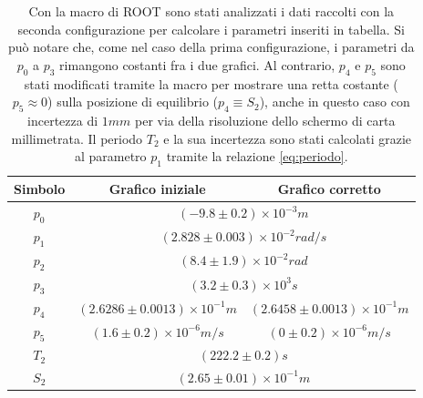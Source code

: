 \documentclass{article}
\begin{document}
\begin{table}[ht!]
     \centering
     \begin{tabular}{|c|c|c|}
         \hline
         Simbolo & Grafico iniziale & Grafico corretto \\
         \hline
         $p_0$ & \multicolumn{2}{c|}{$(-9.8 \pm 0.2)\times10^{-3}m$} \\
         \hline
         $p_1$ & \multicolumn{2}{c|}{$(2.828 \pm 0.003)\times10^{-2}rad/s$} \\
         \hline
         $p_2$ & \multicolumn{2}{c|}{$(8.4 \pm 1.9)\times10^{-2}rad$} \\
         \hline
         $p_3$ & \multicolumn{2}{c|}{$(3.2 \pm 0.3)\times10^{3}s$} \\
         \hline
         $p_4$ & $(2.6286 \pm 0.0013)\times10^{-1}m$ & $(2.6458\pm 0.0013)\times10^{-1}m$ \\
         \hline
         $p_5$ & $(1.6 \pm 0.2)\times10^{-6}m/s$ & $(0 \pm 0.2)\times10^{-6}m/s$ \\
         \hline
         \hline
         $T_2$ & \multicolumn{2}{c|}{$(222.2 \pm 0.2)s$} \\
         \hline
         $S_2$ & \multicolumn{2}{c|}{$(2.65\pm 0.01)\times10^{-1}m$} \\
         \hline
     \end{tabular}
     \caption{Con la macro di ROOT sono stati analizzati i dati raccolti con la seconda configurazione per calcolare i parametri inseriti in tabella. Si può notare che, come nel caso della prima configurazione, i parametri da $p_0$ a $p_3$ rimangono costanti fra i due grafici. Al contrario, $p_4$ e $p_5$ sono stati modificati tramite la macro per mostrare una retta costante ($p_5 \approx 0$) sulla posizione di equilibrio ($p_4 \equiv S_2$), anche in questo caso con incertezza di $1mm$ per via della risoluzione dello schermo di carta millimetrata. Il periodo $T_2$ e la sua incertezza sono stati calcolati grazie al parametro $p_1$ tramite la relazione \eqref{eq:periodo}.}
     \label{tab:parameters_2}
\end{table}
\end{document}
